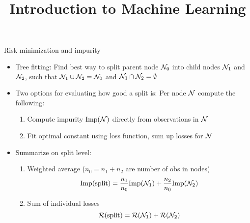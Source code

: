 \documentclass[11pt,compress,t,notes=noshow, xcolor=table]{beamer}
\title{Introduction to Machine Learning}
\begin{document}
    

\begin{vbframe}{Risk minimization and impurity}



\begin{itemize}
    \item Tree fitting: Find best way to split parent node $\mathcal{N}_0$ into child nodes $\mathcal{N}_1$ and $\mathcal{N}_2$, such that $\mathcal{N}_1 \cup \mathcal{N}_2 = \mathcal{N}_0$ and $\mathcal{N}_1 \cap \mathcal{N}_2 = \emptyset$
    \item Two options for evaluating how good a split is: Per node $\mathcal{N}$ compute the following:
\begin{enumerate}
    \item Compute impurity $\text{Imp}(\mathcal{N})$ directly from observations in $\mathcal{N}$
    \item Fit optimal constant using loss function, sum up losses for $\mathcal{N}$
\end{enumerate}
    \item Summarize on split level:
    \begin{enumerate}
        \item Weighted average ($n_0 = n_1 + n_2$ are number of obs in nodes)
        $$\text{Imp(split)} = \frac{n_1}{n_0} \text{Imp}(\mathcal{N}_1) + \frac{n_2}{n_0} \text{Imp}(\mathcal{N}_2)$$
        \item Sum of individual losses
        $$\mathcal{R}(\text{split}) = \mathcal{R}(\mathcal{N}_1) + \mathcal{R}(\mathcal{N}_2)$$
    \end{enumerate}
\end{itemize}

\end{vbframe}
\end{document}
